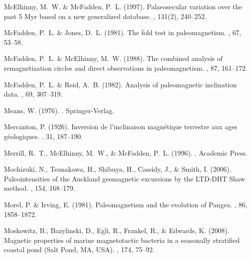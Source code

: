 McElhinny, M.~W. \& McFadden, P.~L. (1997).
\newblock Palaeosecular variation over the past 5 Myr based on a new
  generalized database.
, 131(2), 240--252.

McFadden, P.~L. \& Jones, D.~L. (1981).
\newblock The fold test in paleomagnetism.
, 67, 53--58.

McFadden, P.~L. \& McElhinny, M.~W. (1988).
\newblock The combined analysis of remagnetization circles and direct
  observations in paleomagnetism.
, 87, 161--172.

McFadden, P.~L. \& Reid, A.~B. (1982).
\newblock Analysis of paleomagnetic inclination data.
, 69, 307--319.

Means, W. (1976).
.
\newblock Springer-Verlag.

Mercanton, P. (1926).
\newblock Inversion de l'inclinaison magn\'etique terrestre aux ages
  g\'eologiques.
, 31, 187--190.

Merrill, R.~T., McElhinny, M.~W., \& McFadden, P.~L. (1996).
.
\newblock Academic Press.

Mochizuki, N., Tsunakawa, H., Shibuya, H., Cassidy, J., \& Smith, I. (2006).
\newblock Paleointensities of the Auckland geomagnetic excursions by the
  LTD-DHT Shaw method.
, 154, 168--179.

Morel, P. \& Irving, E. (1981).
\newblock Paleomagnetism and the evolution of Pangea.
, 86, 1858--1872.

Moskowitz, B., Bazylinski, D., Egli, R., Frankel, R., \& Edwards, K. (2008).
\newblock Magnetic properties of marine magnetotactic bacteria in a seasonally
  stratified coastal pond (Salt Pond, MA, USA).
, 174, 75--92.

